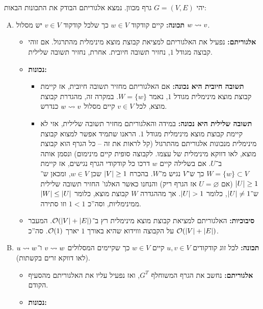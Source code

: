 \documentclass[]{../../../../tex/classes/homework}
\begin{document}
	\npage
	\section{}
	יהי $G = (V, E)$ גרף מכוון. נמצא אלגוריתם הבודק את התכונות הבאות: 
	\begin{enumerate}[(A)]
		\item \textbf{תכונה: }קיים קודקוד $w \in V$ כך שלכל קודקוד $v \in V$ יש מסלול $w \rightsquigarrow v$. 
		\begin{itemize}
			\item \textbf{אלגוריתם: }נפעיל את האלגוריתם למציאת קבוצת מוצא מינימלית מהתרגול. אם זוהי קבוצה מגודל $1$, נחזיר תשובה חיובית. אחרת, נחזיר תשובה שלילית. 
			\item \textbf{נכונות: }
			\begin{itemize}
				\item \textbf{תשובה חיובית היא נכונה: }אם האלגוריתם מחזיר תשובה חיובית, אז קיימת קבוצת מוצא מינימלית מגודל $1$, נאמר $W = \{w\}$. במקרה זה, מהגדרת קבוצת מוצא, לכל $v \in V$ קיים מסלול $w \rightsquigarrow v$ כנדרש. 
				\item \textbf{תשובה שלילית היא נכונה: }במידה והאלגוריתם מחזיר תשובה שלילית, אזי לא קיימת קבוצת מוצא מינימלית מגודל $1$. הראנו שתמיד אפשר למצוא קבוצת מינימלית מנכונות אלגוריתם מהתרגול (קל לראות את זה – כל הגרף הוא קבוצת מוצא, לאו דווקא מינימלית של עצמו. לקבוצה סופית קיים מינימום) ונסמן אותה ב־$U$. 
				אם בשלילה קיים $w$ דרכו כל קודקודי הגרף נגישים, אז קיימת $W = \{w\} \subset V$ כך ש־$V$ נגיש מ־$W$. בהכרח $\left \lvert V \right \rvert \ge 1$ שכן $w \in V$, ומכאן ש־$\left \lvert U \right \rvert \ge 1$ (אם $U = \varnothing$ אז הגרף ריק) והנחנו כאשר האלגו' החזיר תשובה שלילית ש־$\left \lvert U \right \rvert \neq 1$, כלומר $\left \lvert U \right \rvert > 1$. אך מההגדרה $W$ קבוצת מוצא, כלומר $\left \lvert W \right \rvert \le \left \lvert U \right \rvert$ ממינימליות, וסה''כ $1 < 1$ וזו סתירה. 
			\end{itemize}
			\item \textbf{סיבוכיות: }האלגוריתם למציאת קבוצת מוצא מינימלית רץ ב־$\mathcal{O}(\left \lvert V \right \rvert + \left \lvert E \right \rvert)$. המעבר על הקבוצה וווידוא שהיא באורך $1$ יארך $\mathcal{O}(1)$. סה''כ $\mathcal{O}(\left \lvert V \right \rvert + \left \lvert E \right \rvert)$. 
		\end{itemize}
		\item \textbf{תכונה: }לכל זוג קודקודים $u, v \in V$ קיים $w \in V$ כך שקיימים המסלולים $v \rightsquigarrow w$ ו־$u \rightsquigarrow w$ (לאו דווקא זרים בקשתות). 
		\begin{itemize}
			\item \textbf{אלגוריתם: }נחשב את הגרף המשוחלף $G^{T}$, ואז נפעיל עליו את האלגוריתם מהסעיף הקודם. 
			\item \textbf{נכונות: }
			\begin{itemize}

\end{itemize}
\end{itemize}
\end{enumerate}
\end{document}
